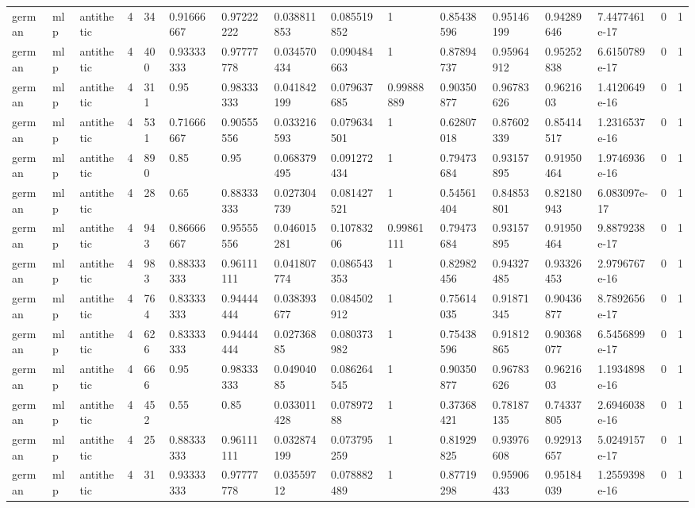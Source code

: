 \begin{tabular}{llllllllllllllll}
german & mlp & antithetic & 4 & 34 & 0.91666667 & 0.97222222 & 0.038811853 & 0.085519852 & 1 & 0.85438596 & 0.95146199 & 0.94289646 & 7.4477461e-17 & 0 & 1 \\
german & mlp & antithetic & 4 & 400 & 0.93333333 & 0.97777778 & 0.034570434 & 0.090484663 & 1 & 0.87894737 & 0.95964912 & 0.95252838 & 6.6150789e-17 & 0 & 1 \\
german & mlp & antithetic & 4 & 311 & 0.95 & 0.98333333 & 0.041842199 & 0.079637685 & 0.99888889 & 0.90350877 & 0.96783626 & 0.9621603 & 1.4120649e-16 & 0 & 1 \\
german & mlp & antithetic & 4 & 531 & 0.71666667 & 0.90555556 & 0.033216593 & 0.079634501 & 1 & 0.62807018 & 0.87602339 & 0.85414517 & 1.2316537e-16 & 0 & 1 \\
german & mlp & antithetic & 4 & 890 & 0.85 & 0.95 & 0.068379495 & 0.091272434 & 1 & 0.79473684 & 0.93157895 & 0.91950464 & 1.9746936e-16 & 0 & 1 \\
german & mlp & antithetic & 4 & 28 & 0.65 & 0.88333333 & 0.027304739 & 0.081427521 & 1 & 0.54561404 & 0.84853801 & 0.82180943 & 6.083097e-17 & 0 & 1 \\
german & mlp & antithetic & 4 & 943 & 0.86666667 & 0.95555556 & 0.046015281 & 0.10783206 & 0.99861111 & 0.79473684 & 0.93157895 & 0.91950464 & 9.8879238e-17 & 0 & 1 \\
german & mlp & antithetic & 4 & 983 & 0.88333333 & 0.96111111 & 0.041807774 & 0.086543353 & 1 & 0.82982456 & 0.94327485 & 0.93326453 & 2.9796767e-16 & 0 & 1 \\
german & mlp & antithetic & 4 & 764 & 0.83333333 & 0.94444444 & 0.038393677 & 0.084502912 & 1 & 0.75614035 & 0.91871345 & 0.90436877 & 8.7892656e-17 & 0 & 1 \\
german & mlp & antithetic & 4 & 626 & 0.83333333 & 0.94444444 & 0.02736885 & 0.080373982 & 1 & 0.75438596 & 0.91812865 & 0.90368077 & 6.5456899e-17 & 0 & 1 \\
german & mlp & antithetic & 4 & 666 & 0.95 & 0.98333333 & 0.04904085 & 0.086264545 & 1 & 0.90350877 & 0.96783626 & 0.9621603 & 1.1934898e-16 & 0 & 1 \\
german & mlp & antithetic & 4 & 452 & 0.55 & 0.85 & 0.033011428 & 0.07897288 & 1 & 0.37368421 & 0.78187135 & 0.74337805 & 2.6946038e-16 & 0 & 1 \\
german & mlp & antithetic & 4 & 25 & 0.88333333 & 0.96111111 & 0.032874199 & 0.073795259 & 1 & 0.81929825 & 0.93976608 & 0.92913657 & 5.0249157e-17 & 0 & 1 \\
german & mlp & antithetic & 4 & 31 & 0.93333333 & 0.97777778 & 0.03559712 & 0.078882489 & 1 & 0.87719298 & 0.95906433 & 0.95184039 & 1.2559398e-16 & 0 & 1 \\

\end{tabular}
